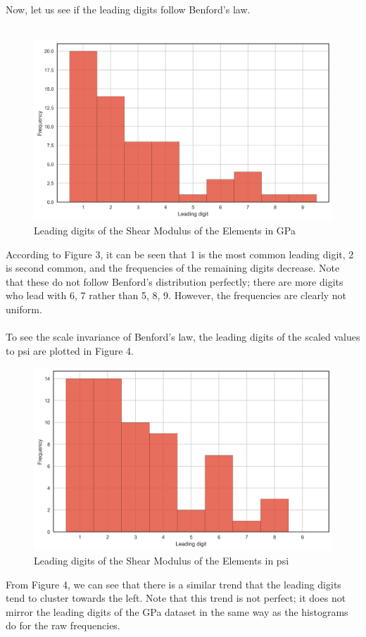 \documentclass[12pt, titlepage]{article}
\begin{document}
Now, let us see if the leading digits follow Benford's law.  \\\\
\begin{figure}[h]
\caption{Leading digits of the Shear Modulus of the Elements in GPa \cite{elements}}
\centering
\includegraphics[width=\textwidth*3/4]{assets/digits.png}
\end{figure}
According to Figure 3, it can be seen that 1 is the most common leading digit, 2 is second common, and the frequencies of the remaining digits decrease. Note that these do not follow Benford's distribution perfectly; there are more digits who lead with 6, 7 rather than 5, 8, 9. However, the frequencies are clearly not uniform. \\\\
To see the scale invariance of Benford's law, the leading digits of the scaled values to psi are plotted in Figure 4.
\begin{figure}[h]
\caption{Leading digits of the Shear Modulus of the Elements in psi \cite{elements}}
\centering
\includegraphics[width=\textwidth*3/4]{assets/digits_psi.png}
\end{figure}
From Figure 4, we can see that there is a similar trend that the leading digits tend to cluster towards the left. Note that this trend is not perfect; it does not mirror the leading digits of the GPa dataset in the same way as the histograms do for the raw frequencies.
\end{document}
